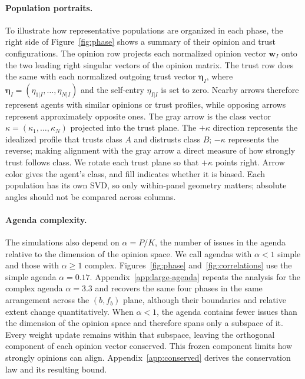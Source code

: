 \documentclass{article}
\newcommand{\fb}{f_{b}}
\begin{document}
\paragraph{Population portraits.} To illustrate how representative populations
are organized in each phase, the right side of Figure~\ref{fig:phase} shows a summary of their
opinion and trust configurations. The opinion row projects each normalized
opinion vector $\mathbf{w}_I$ onto the two leading right singular vectors of the
opinion matrix. The trust row does the same with each normalized outgoing trust
vector $\boldsymbol{\eta}_I$, where
$\boldsymbol{\eta}_I=(\eta_{1|I},\ldots,\eta_{N|I})$ and the self-entry
$\eta_{I|I}$ is set to zero. Nearby arrows therefore represent agents with
similar opinions or trust profiles, while opposing arrows represent approximately
opposite ones. The gray arrow is the class vector
$\kappa=(\kappa_1,\ldots,\kappa_N)$ projected into the trust plane. The
$+\kappa$ direction represents the idealized profile that trusts class $A$ and
distrusts class $B$; $-\kappa$ represents the reverse; making alignment with the gray arrow a direct
measure of how strongly trust follows class. We rotate each trust plane
so that $+\kappa$ points right. Arrow color gives the agent's class,
and fill indicates whether it is biased. Each population has its own SVD, so only
within-panel geometry matters; absolute angles should not be compared across
columns.

\paragraph{Agenda complexity.} The simulations also depend on
$\alpha=P/K$, the number of issues in the agenda relative to the dimension of
the opinion space. We call agendas with $\alpha<1$ simple and those with
$\alpha\geq1$ complex. Figures~\ref{fig:phase} and~\ref{fig:correlations} use the
simple agenda $\alpha=0.17$. Appendix~\ref{app:large-agenda} repeats the analysis
for the complex agenda $\alpha=3.3$ and recovers the same four phases in the same
arrangement across the $(b,\fb)$ plane, although their boundaries and relative
extent change quantitatively. When $\alpha<1$, the agenda contains fewer issues
than the dimension of the opinion space and therefore spans only a subspace of
it. Every weight update remains within that subspace, leaving the orthogonal
component of each opinion vector conserved. This frozen component limits how
strongly opinions can align. Appendix~\ref{app:conserved} derives the
conservation law and its resulting bound.
\end{document}
